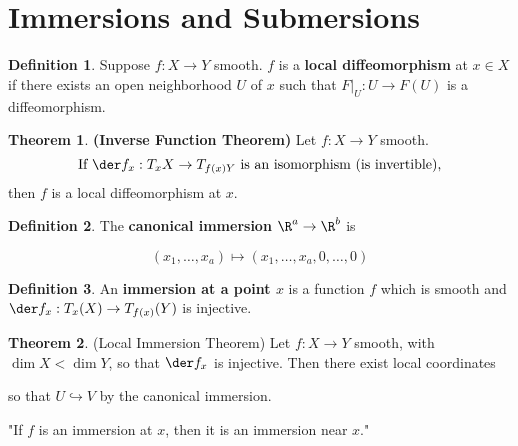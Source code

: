 \documentclass[a5paper]{article}
\theoremstyle{definition}%
\newtheorem{theorem}{Theorem}
\newtheorem*{corollary*}{Corollary}
\newtheorem*{definition*}{Definition}
\numberwithin{exercise}{section}
\theoremstyle{remark}%
\newtheorem*{remark*}{Remark}
\renewcommand{\emph}{\textbf}
\begin{document}
\section{Immersions and Submersions}

\begin{definition*}
Suppose $f:X\to Y$ smooth. $f$ is a \emph{local diffeomorphism }at $x\in X$ if there exists an open neighborhood $U$ of $x$ such that $F|_U:U\to F(U)$ is a diffeomorphism.
\end{definition*}

\begin{highlight}
\begin{theorem}\textbf{(Inverse Function Theorem)}
Let $f:X\to Y$ smooth. 
$$\text{If }\der f_x:T_xX\to T_{f(x)Y} \text{ is an isomorphism (is invertible),}$$
then $f$ is a local diffeomorphism at $x$. 
\end{theorem}
\end{highlight}

%
%
%

\begin{definition*}
The \emph{canonical immersion} $\R^a\to \R^b$ is 

$$(x_1, \dots, x_a) \mapsto (x_1, \dots, x_a, 0, \dots, 0)$$
\end{definition*}

\begin{definition*}
An \emph{immersion at a point $x$} is a function $f$ which is smooth and $\der	f_x:T_x(X)\to T_{f(x)}(Y)$ is injective. 
\end{definition*}

\begin{highlight}
\begin{theorem}(Local Immersion Theorem)
Let $f:X\to Y$ smooth, with $\dim X < \dim Y$, so that $\der f_x$ is injective. 
%
%
Then there exist local coordinates 


so that $U\hookrightarrow V$ by the canonical immersion. %

"If $f$ is an immersion at $x$, then it is an immersion near $x$."
\end{theorem}
\end{highlight}
\end{document}
